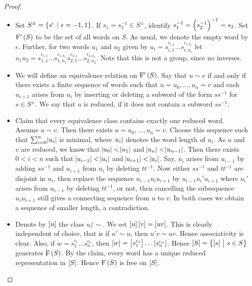 \begin{proof}
\hfill
\begin{itemize}
\item Set $ S^\pm = \cbr{s^\epsilon \st \epsilon = -1, 1} $. If $ s_1 = s_2^{-1} \in S^\pm $, identify $ s_1^{-1} = \br{s_2^{-1}}^{-1} = s_2 $. Set $ \F'\br{S} $ to be the set of all words on $ S $. As usual, we denote the empty word by $ \epsilon $. Further, for two words $ u_1 $ and $ u_2 $ given by $ u_i = s_{i, 1}^{\epsilon_{i, 1}} \dots s_{i, n_i}^{\epsilon_{i, n_i}} $ let $ u_1u_2 = s_{1, 1}^{\epsilon_{1, 1}} \dots s_{1, n_1}^{\epsilon_{1, n_1}}s_{2, 1}^{\epsilon_{2, 1}} \dots s_{2, n_2}^{\epsilon_{2, n_2}} $. Note that this is not a group, since no inverses.
\item We will define an equivalence relation on $ \F'\br{S} $. Say that $ u \sim v $ if and only if there exists a finite sequence of words such that $ u = u_0, \dots, u_n = v $ and each $ u_{i + 1} $ arises from $ u_i $ by inserting or deleting a subword of the form $ ss^{-1} $ for $ s \in S^\pm $. We say that $ u $ is reduced, if it does not contain a subword $ ss^{-1} $.
\item Claim that every equivalence class contains exactly one reduced word. Assume $ u \sim v $. Then there exists $ u = u_0, \dots, u_n = v $. Choose this sequence such that $ \sum_{i = 0}^n \abs{u_i} $ is minimal, where $ \abs{u_i} $ denotes the word length of $ u_i $. As $ u $ and $ v $ are reduced, we know that $ \abs{u_0} < \abs{u_1} $ and $ \abs{u_n} < \abs{u_{n - 1}} $. Then there exists $ 0 < i < n $ such that $ \abs{u_{i - 1}} < \abs{u_i} $ and $ \abs{u_{i + 1}} < \abs{u_i} $. Say, $ u_i $ arises from $ u_{i - 1} $ by adding $ ss^{-1} $ and $ u_{i + 1} $ from $ u_i $ by deleting $ tt^{-1} $. Now either $ ss^{-1} $ and $ tt^{-1} $ are disjoint in $ u_i $, then replace the sequence $ u_{i - 1}u_iu_{i + 1} $ by $ u_{i - 1}u_i'u_{i + 1} $ where $ u_i' $ arises from $ u_{i - 1} $ by deleting $ tt^{-1} $, or not, then cancelling the subsequence $ u_iu_{i + 1} $ still gives a connecting sequence from $ u $ to $ v $. In both cases we obtain a sequence of smaller length, a contradiction.
\item Denote by $ \sbr{u} $ the class $ u / \sim $. We set $ \sbr{u}\sbr{v} = \sbr{uv} $. This is clearly independent of choice, that is if $ u' \sim u $, then $ u'v \sim uv $. Hence associativity is clear. Also, if $ w = s_1^{\epsilon_1} \dots s_n^{\epsilon_n} $, then $ \sbr{w} = \sbr{s_1^{\epsilon_1}} \dots \sbr{s_n^{\epsilon_n}} $. Hence $ \sbr{S} = \cbr{\sbr{s} \st s \in S} $ generates $ \F\br{S} $. By the claim, every word has a unique reduced representation in $ \sbr{S} $. Hence $ \F\br{S} $ is free on $ \sbr{S} $.
\end{itemize}
\end{proof}

